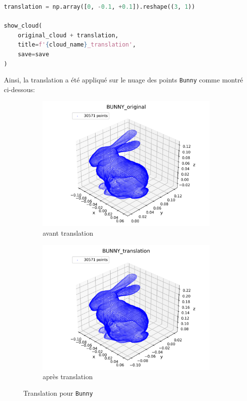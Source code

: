 \documentclass[../5RO17_TP4.tex]{subfiles}
\begin{document}
\begin{scriptsize}\mycode
	\begin{lstlisting}[language=Python, caption=\texttt{translation()}]
translation = np.array([0, -0.1, +0.1]).reshape((3, 1))

show_cloud(
    original_cloud + translation,
    title=f'{cloud_name}_translation',
    save=save
)
	\end{lstlisting}
\end{scriptsize}
\noindent Ainsi, la translation a été appliqué sur le nuage des points \texttt{Bunny} comme montré ci-dessous:
\begin{figure}[H]
    \centering
    \begin{subfigure}[b]{0.475\textwidth}
        \centering
        \includegraphics[width=\linewidth]{images/BUNNY_original.png}
        \caption{avant translation}
        \label{}
    \end{subfigure}\hfill
    \begin{subfigure}[b]{0.475\textwidth}
        \centering
        \includegraphics[width=\linewidth]{images/BUNNY_translation.png}
        \caption{après translation}
        \label{}
    \end{subfigure}
    \caption{Translation pour \texttt{Bunny}}
    \label{fig:translation}
\end{figure}
\end{document}

